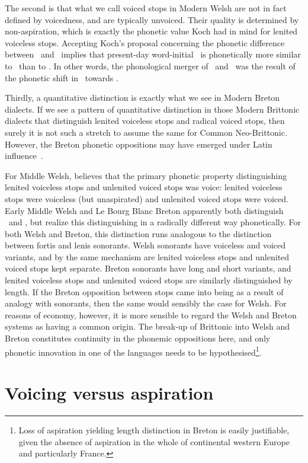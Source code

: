 The second is that what we call voiced stops in Modern Welsh are not in fact defined by voicedness, and are typically unvoiced. Their quality is determined by non-aspiration, which is exactly the phonetic value Koch had in mind for lenited voiceless stops. Accepting Koch's proposal concerning the phonetic difference between \lT\ and \xD\ implies that present-day word-initial \xD\ is phonetically more similar to \lT\ than to \xD. In other words, the phonological merger of \lT\ and \xD\ was the result of the phonetic shift in \xD\ towards \lT.

Thirdly, a quantitative distinction is exactly what we see in Modern Breton dialects. If we see a pattern of quantitative distinction in those Modern Brittonic dialects that distinguish lenited voiceless stops and radical voiced stops, then surely it is not such a stretch to assume the same for Common Neo-Brittonic. However, the Breton phonetic oppositions may have emerged under Latin influence~\autocite[31]{schrijver_old_2011}.

For Middle Welsh, \textcite*{koch_*cothairche_1990} believes that the primary phonetic property distinguishing lenited voiceless stops and unlenited voiced stops was voice: lenited voiceless stops were voiceless (but unaspirated) and unlenited voiced stops were voiced. Early Middle Welsh and Le Bourg Blanc Breton apparently both distinguish \lT\ and \xD, but realize this distinguishing in a radically different way phonetically. For both Welsh and Breton, this distinction runs analogous to the distinction between fortis and lenis sonorants. Welsh sonorants have voiceless and voiced variants, and by the same mechanism are lenited voiceless stops and unlenited voiced stops kept separate. Breton sonorants have long and short variants, and lenited voiceless stops and unlenited voiced stops are similarly distinguished by length. If the Breton opposition between stops came into being as a result of analogy with sonorants, then the same would sensibly the case for Welsh. For reasons of economy, however, it is more sensible to regard the Welsh and Breton systems as having a common origin. The break-up of Brittonic into Welsh and Breton constitutes continuity in the phonemic oppositions here, and only phonetic innovation in one of the languages needs to be hypothesised\footnote{Loss of aspiration yielding length distinction in Breton is easily justifiable, given the absence of aspiration in the whole of continental western Europe and particularly France.}. 


\section{Voicing versus aspiration}
\label{sec:voic-vers-aspir}

